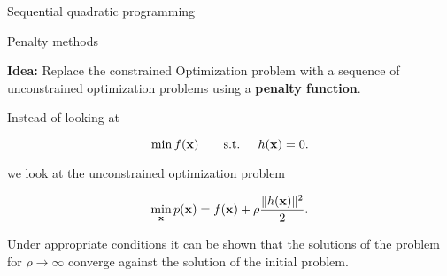 \documentclass[11pt,compress,t,notes=noshow, xcolor=table]{beamer}
\begin{document}
\begin{vbframe}{Sequential quadratic programming}
%
%
%
%
%
%
%
%
%
%
%
%

\end{vbframe}

\begin{vbframe}{Penalty methods}

\textbf{Idea:} Replace the constrained Optimization problem with a sequence of unconstrained optimization problems using a \textbf{penalty function}.

\lz

Instead of looking at

$$
\min f(\mathbf{x}) \qquad \text{s.t. } \quad h(\mathbf{x}) = 0.
$$

we look at the unconstrained optimization problem

$$
\min_{\mathbf{x}} p(\mathbf{x}) = f(\mathbf{x}) + \rho \frac{\|h(\mathbf{x})\|^2}{2}.
$$

Under appropriate conditions it can be shown that the solutions of the problem for $\rho \to \infty$ converge against the solution of the initial problem.

\end{vbframe}
\end{document}
